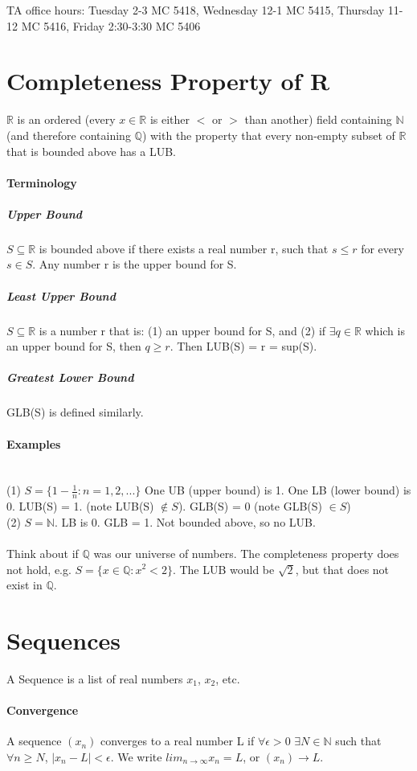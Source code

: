 \documentclass[10pt,letter]{article}
\begin{document}
TA office hours: Tuesday 2-3 MC 5418, Wednesday 12-1 MC 5415, Thursday 11-12 MC 5416, Friday 2:30-3:30 MC 5406

\section*{Completeness Property of R}
$\mathbb{R}$ is an ordered (every $x \in \mathbb{R}$ is either $<$ or $>$ than another) field containing $\mathbb{N}$ (and therefore containing $\mathbb{Q}$) with the property that every non-empty subset of $\mathbb{R}$ that is bounded above has a LUB. 

\paragraph*{Terminology}
\subparagraph*{Upper Bound}
$S\subseteq\mathbb{R}$ is bounded above if there exists a real number r, such that $s \leq r$ for every $s\in S$. Any number r is the upper bound for S. 

\subparagraph*{Least Upper Bound}
$S\subseteq\mathbb{R}$ is a number r that is: (1) an upper bound for S, and (2) if $\exists q\in\mathbb{R}$ which is an upper bound for S, then $q \geq r$. Then LUB(S) = r = sup(S). 

\subparagraph*{Greatest Lower Bound}
GLB(S) is defined similarly. 

\paragraph*{Examples}\mbox{}\\
(1) $S = \{1-\frac{1}{n}:n = 1,2,...\}$ One UB (upper bound) is 1. One LB (lower bound) is 0. LUB(S) = 1. (note LUB(S) $\notin S$). GLB(S) = 0 (note GLB(S) $\in S$) \\
(2) $S = \mathbb{N}$. LB is 0. GLB = 1. Not bounded above, so no LUB. \\ \\ 

Think about if $\mathbb{Q}$ was our universe of numbers. The completeness property does not hold, e.g. $S = \{x\in\mathbb{Q}:x^2 <2\}$. The LUB would be $\sqrt{2}$, but that does not exist in $\mathbb{Q}$. 

\section*{Sequences}
A Sequence is a list of real numbers $x_1$, $x_2$, etc.

\paragraph*{Convergence}
A sequence $(x_n)$ converges to a real number L if $\forall\epsilon>0$ $\exists N\in \mathbb{N}$ such that $\forall n\geq N$, $|x_n - L| < \epsilon$. We write $lim_{n\rightarrow\infty}x_n = L$, or $(x_n)\rightarrow L$.
\end{document}
